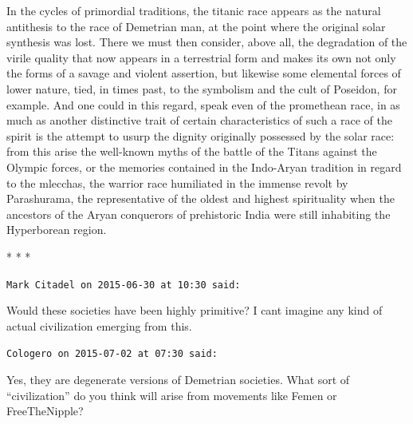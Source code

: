 In the cycles of primordial traditions, the titanic race appears as the natural antithesis to the race of Demetrian man, at the point where the original solar synthesis was lost. There we must then consider, above all, the degradation of the virile quality that now appears in a terrestrial form and makes its own not only the forms of a savage and violent assertion, but likewise some elemental forces of lower nature, tied, in times past, to the symbolism and the cult of Poseidon, for example. And one could in this regard, speak even of the promethean race, in as much as another distinctive trait of certain characteristics of such a race of the spirit is the attempt to usurp the dignity originally possessed by the solar race: from this arise the well-known myths of the battle of the Titans against the Olympic forces, or the memories contained in the Indo-Aryan tradition in regard to the mlecchas, the warrior race humiliated in the immense revolt by Parashurama, the representative of the oldest and highest spirituality when the ancestors of the Aryan conquerors of prehistoric India were still inhabiting the Hyperborean region.



\begin{center}* * *\end{center}

\begin{footnotesize}
\begin{sffamily}
\texttt{Mark Citadel on 2015-06-30 at 10:30 said:}

Would these societies have been highly primitive? I cant imagine any kind of actual civilization emerging from this.

\hfill

\texttt{Cologero on 2015-07-02 at 07:30 said:}

Yes, they are degenerate versions of Demetrian societies. What sort of ``civilization'' do you think will arise from movements like Femen or FreeTheNipple?

\end{sffamily}
\end{footnotesize}

